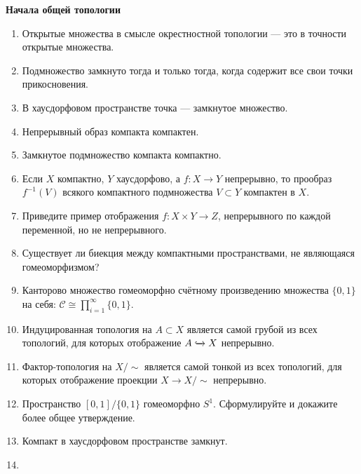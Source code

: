\documentclass[a4paper]{article}
\def \incl 	{\xhookrightarrow}
\begin{document}


\begin{center}
	\large{\textbf{Начала общей топологии}}
\end{center}

\begin{enumerate}
\item Открытые множества в смысле окрестностной топологии --- это в точности открытые множества.
\item Подмножество замкнуто тогда и только тогда, когда содержит все свои точки прикосновения.
\item В хаусдорфовом пространстве точка --- замкнутое множество.
\item Непрерывный образ компакта компактен.
\item Замкнутое подмножество компакта компактно.
\item Если $X$ компактно, $Y$ хаусдорфово, а $f\colon X\to Y$ непрерывно, то прообраз $f^{-1}(V)$ всякого компактного подмножества $V\subset Y$ компактен в $X$.
\item Приведите пример отображения $f\colon X\times Y\to Z$, непрерывного по каждой переменной, но не непрерывного.
\item Существует ли биекция между компактными пространствами, не являющаяся гомеоморфизмом?
\item Канторово множество гомеоморфно счётному произведению множества $\{0,1\}$ на себя: $\mathcal{C}\cong\displaystyle\prod\limits_{i=1}^{\infty} \{0,1\}$.
\item Индуцированная топология на $A\subset X$ является самой грубой из всех топологий, для которых отображение $A\incl{} X$ непрерывно.
\item Фактор-топология на $X/\sim$ является самой тонкой из всех топологий, для которых отображение проекции $X\to X/\sim$ непрерывно.
\item Пространство $[0,1]/\{0,1\}$ гомеоморфно $S^1$. Сформулируйте и докажите более общее утверждение.
\item Компакт в хаусдорфовом пространстве замкнут.
\item 

\end{enumerate}
\end{document}
